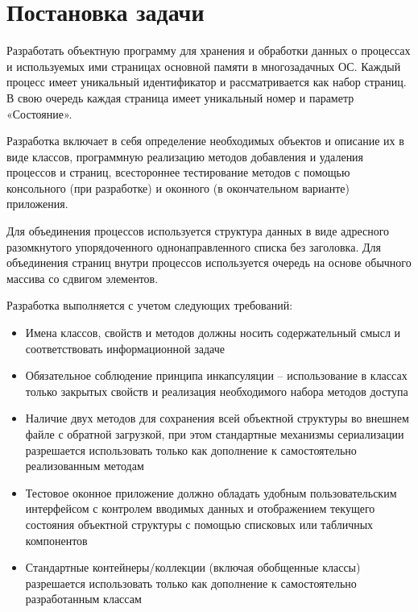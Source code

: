 \documentclass[russian,utf8,simple,hpadding=10mm,vpadding=20mm]{eskdtext}
\begin{document}
\maketitle
\newpage

\sloppy

\linespread{1,5}
\tableofcontents

\newpage
\parindent=15mm
\doublespacing
\section{Постановка задачи}

Разработать объектную программу для хранения и обработки данных о процессах и используемых ими страницах основной памяти в многозадачных ОС. Каждый процесс имеет уникальный идентификатор и рассматривается как набор страниц. В свою очередь каждая страница имеет уникальный номер и параметр «Состояние».

Разработка включает в себя определение необходимых объектов и описание их в виде классов, программную реализацию методов добавления и удаления процессов и страниц, всестороннее тестирование методов с помощью консольного (при разработке) и оконного (в окончательном варианте) приложения.

Для объединения процессов используется структура данных в виде адресного разомкнутого упорядоченного однонаправленного списка без заголовка. Для объединения страниц внутри процессов  используется очередь на основе обычного массива со сдвигом элементов.

Разработка выполняется с учетом следующих требований:

\begin{itemize}
\item Имена классов, свойств и методов должны носить содержательный смысл и соответствовать информационной задаче
\item Обязательное соблюдение принципа инкапсуляции – использование в классах только закрытых свойств и реализация необходимого набора методов доступа
\item Наличие двух методов для сохранения всей объектной структуры во внешнем файле с обратной загрузкой, при этом стандартные механизмы сериализации разрешается использовать только как дополнение к самостоятельно реализованным методам
\item Тестовое оконное приложение должно обладать удобным пользовательским интерфейсом с контролем вводимых данных и отображением текущего состояния объектной структуры с помощью списковых или табличных компонентов
\item Стандартные контейнеры/коллекции (включая обобщенные классы) разрешается использовать только как дополнение к самостоятельно разработанным классам
\end{itemize}
 
\end{document}
